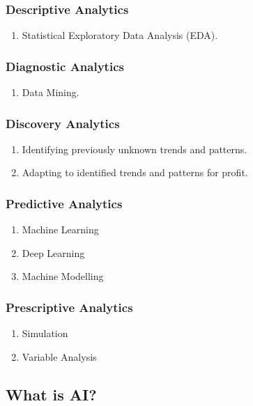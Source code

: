 \documentclass[12pt letter]{report}
\begin{document}
\subsubsection{Descriptive Analytics}
\begin{enumerate}
  \item Statistical Exploratory Data Analysis (EDA).
\end{enumerate}

\subsubsection{Diagnostic Analytics}
\begin{enumerate}
  \item Data Mining.
\end{enumerate}
\subsubsection{Discovery Analytics}
\begin{enumerate}
  \item Identifying previously unknown trends and patterns.
  \item Adapting to identified trends and patterns for profit.
\end{enumerate}
\subsubsection{Predictive Analytics}
\begin{enumerate}
  \item Machine Learning
  \item Deep Learning
  \item Machine Modelling
\end{enumerate}
\subsubsection{Prescriptive Analytics}
\begin{enumerate}
  \item Simulation
  \item Variable Analysis
\end{enumerate}

\subsection{What is AI?}

\end{document}
